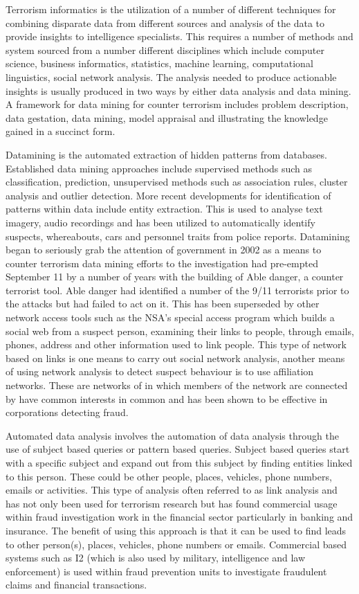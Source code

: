 Terrorism informatics is the utilization of a number of different techniques for combining disparate data from different sources and analysis of the data to  provide insights to intelligence specialists. This requires a number of methods and system sourced from a number different disciplines which include computer science, business informatics, statistics, machine learning, computational linguistics, social network analysis. The analysis needed to produce actionable insights is usually produced in two ways by either data analysis and data mining. A framework for data mining for counter terrorism  includes problem description, data gestation, data mining, model appraisal and illustrating the knowledge gained in a succinct form.

Datamining is the automated extraction of hidden patterns from databases. Established data mining approaches include supervised methods such as  classification, prediction, unsupervised methods such as association rules, cluster analysis and outlier detection. More recent developments for identification of patterns within data include entity extraction. This is used to analyse text imagery, audio recordings and has been utilized to automatically identify suspects, whereabouts, cars and personnel traits from police reports. Datamining began to seriously grab the attention of government in 2002 as a means to counter terrorism data mining efforts to the investigation had pre-empted September 11 by a number of years with the building of Able danger, a counter terrorist tool. Able danger had identified a number of the 9/11 terrorists prior to the attacks but had failed to act on it. This has been superseded by other network access tools such as the NSA's special access program which builds a social web from a suspect person, examining their links to people, through emails, phones, address and other information used to link people. This type of network based on links is one means to carry out social network analysis, another means of using network analysis to detect suspect behaviour is to use affiliation networks. These are networks of in which members of the network are connected by have common interests in common and has been shown to be effective in corporations detecting fraud.

Automated data analysis involves the automation of data analysis through the use of subject based queries or pattern based queries. Subject based queries start with a specific subject and expand out from this subject by finding entities linked to this person. These could be other people, places, vehicles, phone numbers, emails or activities. This type of analysis often referred to as link analysis and has not only been used for terrorism research but has found commercial usage within fraud investigation work in the financial sector particularly in banking and insurance. The benefit of using this approach is that it can be used to find leads to other person(s), places, vehicles, phone numbers or emails. Commercial based systems such as I2 (which is also used by military, intelligence and law enforcement) is used within 
fraud prevention units to investigate fraudulent claims and financial transactions.

